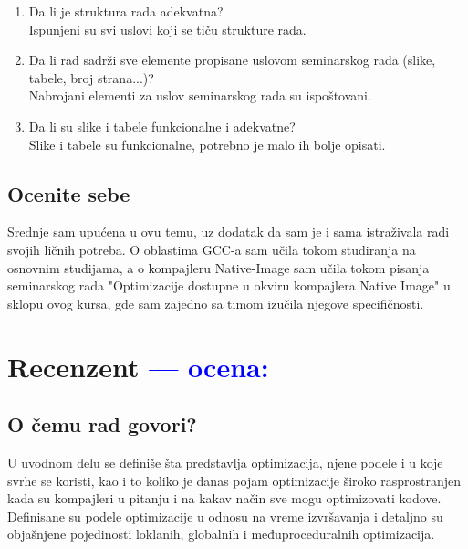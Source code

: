\documentclass[a4paper]{report}
\newcommand{\odgovor}[1]{\textcolor{blue}{#1}}
\begin{document}
\begin{enumerate}
\item Da li je struktura rada adekvatna?\\
Ispunjeni su svi uslovi koji se tiču strukture rada.

\item Da li rad sadrži sve elemente propisane uslovom seminarskog rada (slike, tabele, broj strana...)?\\
Nabrojani elementi za uslov seminarskog rada su ispoštovani.

\item Da li su slike i tabele funkcionalne i adekvatne?\\
Slike i tabele su funkcionalne, potrebno je malo ih bolje opisati.

\end{enumerate}

\section{Ocenite sebe}
Srednje sam upućena u ovu temu, uz dodatak da sam je i sama istraživala radi svojih ličnih potreba. O oblastima GCC-a sam učila tokom studiranja na osnovnim studijama, a o kompajleru Native-Image sam učila tokom pisanja seminarskog rada "Optimizacije dostupne u okviru kompajlera
Native Image" u sklopu ovog kursa, gde sam zajedno sa timom izučila njegove specifičnosti.

\chapter{Recenzent \odgovor{--- ocena:} }


\section{O čemu rad govori?}
U uvodnom delu se definiše šta predstavlja optimizacija, njene podele i u koje svrhe se koristi, kao i to koliko je danas pojam optimizacije široko rasprostranjen kada su kompajleri u pitanju i na kakav način sve mogu optimizovati kodove. Definisane su podele optimizacije u odnosu na vreme izvršavanja i detaljno su objašnjene pojedinosti loklanih, globalnih i međuproceduralnih optimizacija.
\end{document}
